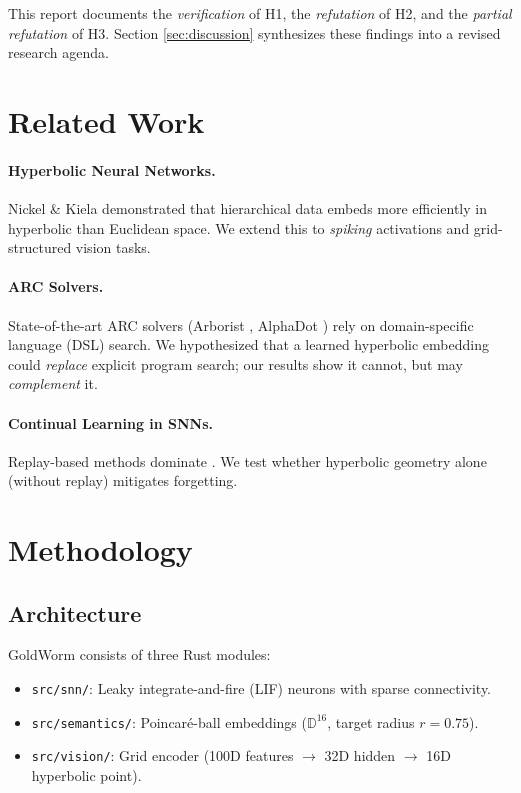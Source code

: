 \documentclass[11pt,a4paper]{article}
\begin{document}
This report documents the \emph{verification} of H1, the \emph{refutation} of H2, and the \emph{partial refutation} of H3. Section \ref{sec:discussion} synthesizes these findings into a revised research agenda.

\section{Related Work}
\label{sec:related}

\paragraph{Hyperbolic Neural Networks.} Nickel \& Kiela \cite{ nickel2017poincare} demonstrated that hierarchical data embeds more efficiently in hyperbolic than Euclidean space. We extend this to \emph{spiking} activations and grid-structured vision tasks.

\paragraph{ARC Solvers.} State-of-the-art ARC solvers (Arborist \cite{arborist}, AlphaDot \cite{alphadot}) rely on domain-specific language (DSL) search. We hypothesized that a learned hyperbolic embedding could \emph{replace} explicit program search; our results show it cannot, but may \emph{complement} it.

\paragraph{Continual Learning in SNNs.} Replay-based methods dominate \cite{replay_snn}. We test whether hyperbolic geometry alone (without replay) mitigates forgetting.

\section{Methodology}
\label{sec:method}

\subsection{Architecture}

GoldWorm consists of three Rust modules:
\begin{itemize}
    \item \texttt{src/snn/}: Leaky integrate-and-fire (LIF) neurons with sparse connectivity.
    \item \texttt{src/semantics/}: Poincaré-ball embeddings ($\mathbb{D}^{16}$, target radius $r=0.75$).
    \item \texttt{src/vision/}: Grid encoder (100D features $\rightarrow$ 32D hidden $\rightarrow$ 16D hyperbolic point).
\end{itemize}
\end{document}
